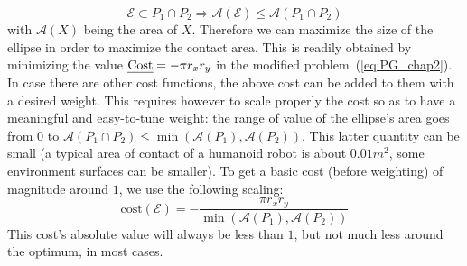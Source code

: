 \begin{equation}
\mathcal{E} \subset P_1 \cap P_2 \Longrightarrow  \mathcal{A}(\mathcal{E}) \le \mathcal{A}(P_1 \cap P_2)
\end{equation}
with $\mathcal{A}(X)$ being the area of $X$.\newline
Therefore we can maximize the size of the ellipse in order to maximize the contact area.
This is readily obtained by minimizing the value $\mbox{\emph{Cost}} = -\pi r_x r_y$ in the modified problem~(\ref{eq:PG_chap2}).
In case there are other cost functions, the above cost can be added to them with a desired weight.
This requires however to scale properly the cost so as to have a meaningful and easy-to-tune weight: the range of value of the ellipse's area goes from $0$ to $\mathcal{A}(P_1 \cap P_2) \leq \min (\mathcal{A}(P_1), \mathcal{A}(P_2))$.
This latter quantity can be small (a typical area of contact of a humanoid robot is about $0.01m^2$, some environment surfaces can be smaller).
To get a basic cost (before weighting) of magnitude around $1$, we use the following scaling:
\begin{equation}
\text{cost}(\mathcal{E}) = - \frac{\pi r_x r_y}{\min (\mathcal{A}(P_1), \mathcal{A}(P_2))}
\label{eq:cost-ellipse}
\end{equation}
This cost's absolute value will always be less than $1$, but not much less around the optimum, in most cases.



